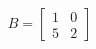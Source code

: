 \documentclass[preview]{standalone}
\begin{document}
\begin{align*}
B = \begin{bmatrix}
                        1 & 0\\
                        5 & 2
                    \end{bmatrix}
\end{align*}
\end{document}
